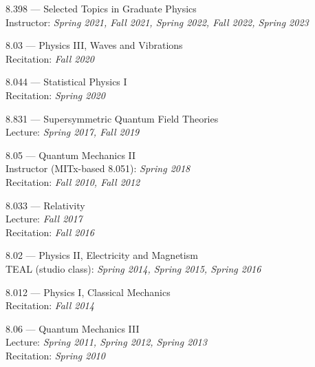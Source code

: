 \bbl
\item 8.398 --- Selected Topics in Graduate Physics
\\ \sh Instructor: \emph{Spring 2021, Fall 2021, Spring 2022, Fall 2022, Spring 2023}
\item 8.03 --- Physics III, Waves and Vibrations
\\ \sh Recitation: \emph{Fall 2020}
\item 8.044 --- Statistical Physics I
\\ \sh Recitation: \emph{Spring 2020}
\item 8.831 --- Supersymmetric Quantum Field Theories
\\ \sh Lecture: \emph{Spring 2017, Fall 2019}
\item 8.05 --- Quantum Mechanics II
\\ \sh Instructor (MITx-based 8.051): \emph{Spring 2018}
\\ \sh Recitation: \emph{Fall 2010, Fall 2012}
\item 8.033 --- Relativity
\\ \sh Lecture: \emph{Fall 2017}
\\ \sh Recitation: \emph{Fall 2016}
\item 8.02 --- Physics II, Electricity and Magnetism
\\ \sh TEAL (studio class): \emph{Spring 2014, Spring 2015, Spring 2016}
\item 8.012 --- Physics I, Classical Mechanics
\\ \sh Recitation: \emph{Fall 2014}
\item 8.06 --- Quantum Mechanics III
\\ \sh Lecture: \emph{Spring 2011, Spring 2012, Spring 2013}
\\ \sh Recitation: \emph{Spring 2010}
\el
